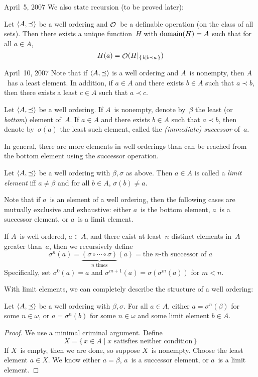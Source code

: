 \begin{lecture}{April~5, 2007}
We also state recursion (to be proved later):
\begin{thm}
Let \(\langle{A},{\preceq}\rangle\) be a well ordering and \(\mathop{\mathcal{O}}\nolimits\)~be a definable operation (on the class of all sets). Then there exists a unique function~\(H\) with \(\operatorname{domain}(H)=A\) such that for all \(a\in A\),
\[H(a)=\mathop{\mathcal{O}}\nolimits(H|_{\{\,b\mid b\prec a\,\}})\]
\end{thm}
\end{lecture}

\begin{lecture}{April~10, 2007}
Note that if \(\langle{A},{\preceq}\rangle\) is a well ordering and \(A\)~is nonempty, then \(A\)~has a least element. In addition, if \(a\in A\) and there exists \(b\in A\) such that \(a\prec b\), then there exists a least \(c\in A\) such that \(a\prec c\).
\begin{defn}
Let \(\langle{A},{\preceq}\rangle\) be a well ordering. If \(A\)~is nonempty, denote by~\(\beta\) the least (or \emph{bottom}) element of~\(A\). If \(a\in A\) and there exists \(b\in A\) such that \(a\prec b\), then denote by~\(\sigma(a)\) the least such element, called the \emph{(immediate) successor} of~\(a\).
\end{defn}
\noindent In general, there are more elements in well orderings than can be reached from the bottom element using the successor operation.
\begin{defn}
Let \(\langle{A},{\preceq}\rangle\) be a well ordering with \(\beta,\sigma\) as above. Then \(a\in A\) is called a \emph{limit element} iff \(a\ne\beta\) and for all \(b\in A\), \(\sigma(b)\ne a\).
\end{defn}
\noindent Note that if \(a\)~is an element of a well ordering, then the following cases are mutually exclusive and exhaustive: either \(a\)~is the bottom element, \(a\)~is a successor element, or \(a\)~is a limit element.

If \(A\)~is well ordered, \(a\in A\), and there exist at least~\(n\) distinct elements in~\(A\) greater than~\(a\), then we recursively define
\[\sigma^n(a)=\underbrace{(\sigma\circ\cdots\circ\sigma)}_{n\text{ times}}(a)=\text{the }n\text{-th successor of }a\]
Specifically, set \(\sigma^0(a)=a\) and \(\sigma^{m+1}(a)=\sigma(\sigma^m(a))\) for \(m<n\).

With limit elements, we can completely describe the structure of a well ordering:
\begin{thm}
Let \(\langle{A},{\preceq}\rangle\) be a well ordering with \(\beta,\sigma\). For all \(a\in A\), either \(a=\sigma^n(\beta)\) for some \(n\in\omega\), or \(a=\sigma^n(b)\) for some \(n\in\omega\) and some limit element \(b\in A\).
\end{thm}
\begin{proof}
We use a minimal criminal argument. Define
\[X=\{\,x\in A\mid x\text{ satisfies neither condition}\,\}\]
If \(X\)~is empty, then we are done, so suppose \(X\)~is nonempty. Choose the least element \(a\in X\). We know either \(a=\beta\), \(a\)~is a successor element, or \(a\)~is a limit element.


\end{proof}
\end{lecture}
